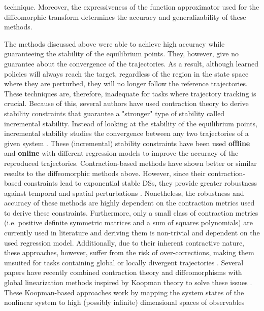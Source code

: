 technique. Moreover, the expressiveness of the function approximator used for the diffeomorphic transform determines the accuracy and generalizability of these methods.

The methods discussed above were able to achieve high accuracy while guaranteeing the stability of the equilibrium points. They, however, give no guarantee about the convergence of the trajectories. As a result, although learned policies will always reach the target, regardless of the region in the state space where they are perturbed, they will no longer follow the reference trajectories. These techniques are, therefore, inadequate for tasks where trajectory tracking is crucial. Because of this, several authors have used contraction theory to derive stability constraints that guarantee a "stronger" type of stability called incremental stability. Instead of looking at the stability of the equilibrium points, incremental stability studies the convergence between any two trajectories of a given system \cite{lohmillerContractionAnalysisNonlinear1998,tsukamotoContractionTheoryNonlinear2021}. These (incremental) stability constraints have been used \textbf{offline} \cite{ravichandarLearningContractingNonlinear2016,ravichandarLearningStableNonlinear2018,khadirTeleoperatorImitationContinuoustime2019,sindhwaniLearningContractingVector2018,ravichandarLearningPositionOrientation2019} and \textbf{online} \cite{blocherLearningStableDynamical2017} with different regression models to improve the accuracy of the reproduced trajectories. Contraction-based methods have shown better or similar results to the diffeomorphic methods above. However, since their contraction-based constraints lead to exponential stable DSs, they provide greater robustness against temporal and spatial perturbations \cite{ravichandarLearningPartiallyContracting2017}. Nonetheless, the robustness and accuracy of these methods are highly dependent on the contraction metrics used to derive these constraints. Furthermore, only a small class of contraction metrics (i.e. positive definite symmetric matrices and a sum of squares polynomials) are currently used in literature and deriving them is non-trivial and dependent on the used regression model. Additionally, due to their inherent contractive nature, these approaches, however, suffer from the risk of over-corrections, making them unsuited for tasks containing global or locally divergent trajectories \cite{figueroafernandezPhysicallyconsistentBayesianNonparametric2018,figueroaLocallyActiveGlobally2022}. Several papers have recently combined contraction theory and diffeomorphisms with global linearization methods inspired by Koopman theory to solve these issues \cite{bevandaKoopmanOperatorDynamical2021}. These Koopman-based approaches work by mapping the system states of the nonlinear system to high (possibly infinite) dimensional spaces of observables
